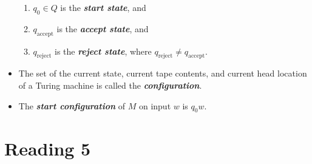 \documentclass{article}
\begin{document}
\begin{itemize}
\begin{enumerate}
        \item $q_0 \in Q$ is the \textbf{\textit{start state}}, and
        \item $q_\textrm{accept}$ is the \textbf{\textit{accept state}}, and
        \item $q_\textrm{reject}$ is the \textbf{\textit{reject state}}, where $q_\textrm{reject}\neq q_\textrm{accept}$.
    \end{enumerate}
    \item The set of the current state, current tape contents, and current head location of a Turing machine is called the \textbf{\textit{configuration}}.
    \item The \textbf{\textit{start configuration}} of $M$ on input $w$ is $q_0 w$. 
\end{itemize}

\section{Reading 5}
\end{document}
